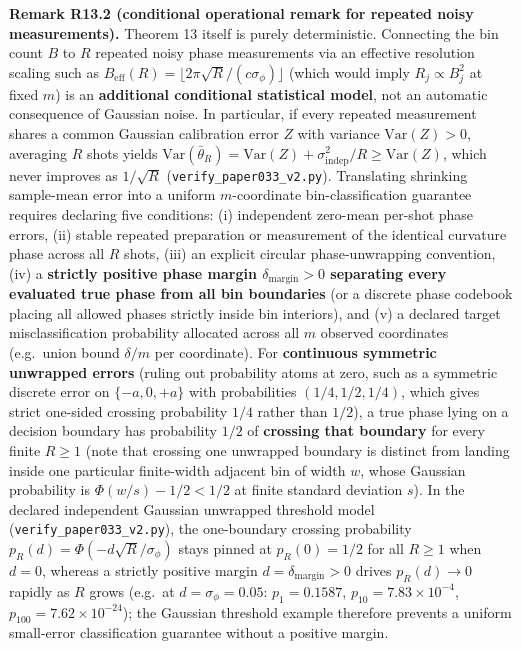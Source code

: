 \documentclass[
  american,
  11pt,
  letterpaper,
]{article}
\begin{document}
\textbf{Remark R13.2 (conditional operational remark for repeated noisy measurements).} Theorem 13 itself is purely deterministic. Connecting the bin count \(B\) to \(R\) repeated noisy phase measurements via an effective resolution scaling such as \(B_{\mathrm{eff}}(R) = \lfloor 2\pi\sqrt{R}/(c\sigma_\phi)\rfloor\) (which would imply \(R_j \propto B_j^2\) at fixed \(m\)) is an \textbf{additional conditional statistical model}, not an automatic consequence of Gaussian noise. In particular, if every repeated measurement shares a common Gaussian calibration error \(Z\) with variance \(\mathrm{Var}(Z) > 0\), averaging \(R\) shots yields \(\mathrm{Var}(\bar{\theta}_R) = \mathrm{Var}(Z) + \sigma_{\mathrm{indep}}^2/R \ge \mathrm{Var}(Z)\), which never improves as \(1/\sqrt{R}\) (\nolinkurl{verify_paper033_v2.py}). Translating shrinking sample-mean error into a uniform \(m\)-coordinate bin-classification guarantee requires declaring five conditions: (i) independent zero-mean per-shot phase errors, (ii) stable repeated preparation or measurement of the identical curvature phase across all \(R\) shots, (iii) an explicit circular phase-unwrapping convention, (iv) a \textbf{strictly positive phase margin \(\delta_{\mathrm{margin}} > 0\) separating every evaluated true phase from all bin boundaries} (or a discrete phase codebook placing all allowed phases strictly inside bin interiors), and (v) a declared target misclassification probability allocated across all \(m\) observed coordinates (e.g.~union bound \(\delta/m\) per coordinate). For \textbf{continuous symmetric unwrapped errors} (ruling out probability atoms at zero, such as a symmetric discrete error on \(\{-a, 0, +a\}\) with probabilities \((1/4, 1/2, 1/4)\), which gives strict one-sided crossing probability \(1/4\) rather than \(1/2\)), a true phase lying on a decision boundary has probability \(1/2\) of \textbf{crossing that boundary} for every finite \(R \ge 1\) (note that crossing one unwrapped boundary is distinct from landing inside one particular finite-width adjacent bin of width \(w\), whose Gaussian probability is \(\Phi(w/s) - 1/2 < 1/2\) at finite standard deviation \(s\)). In the declared independent Gaussian unwrapped threshold model (\nolinkurl{verify_paper033_v2.py}), the one-boundary crossing probability \(p_R(d) = \Phi(-d\sqrt{R}/\sigma_\phi)\) stays pinned at \(p_R(0) = 1/2\) for all \(R \ge 1\) when \(d = 0\), whereas a strictly positive margin \(d = \delta_{\mathrm{margin}} > 0\) drives \(p_R(d) \to 0\) rapidly as \(R\) grows (e.g.~at \(d = \sigma_\phi = 0.05\): \(p_1 = 0.1587\), \(p_{10} = 7.83 \times 10^{-4}\), \(p_{100} = 7.62 \times 10^{-24}\)); the Gaussian threshold example therefore prevents a uniform small-error classification guarantee without a positive margin.
\end{document}
